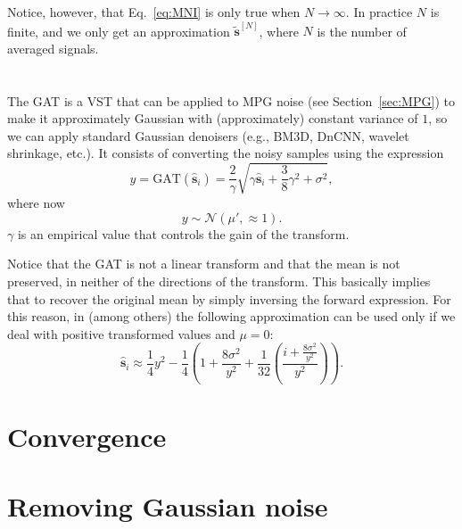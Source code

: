 Notice, however, that Eq.~\ref{eq:MNI} is only true when
$N\rightarrow\infty$. In practice $N$ is finite, and we only get an
approximation $\tilde{\bm{s}}^{[N]}$, where $N$ is the number of
averaged signals.


\section{}

The \acrshort{GAT} \cite{foi2008practical,makitalo2012optimal} is a
\gls{VST} that can be applied to \gls{MPG} noise (see
Section~\ref{sec:MPG}) to make it approximately Gaussian with
(approximately) constant variance of $1$, so we can apply standard
Gaussian denoisers (e.g., \gls{BM3D}, \gls{DnCNN}, wavelet shrinkage,
etc.). It consists of converting the noisy samples using the
expression
\begin{equation}
  y = \text{GAT}(\hat{\mathbf{s}}_i)=\frac{2}{\gamma}\sqrt{\gamma\hat{\mathbf{s}}_i+\frac{3}{8}\gamma^2+\sigma^2},
\end{equation}
where now
\begin{equation}
  y\sim\mathcal{N}(\mu',\approx 1).
\end{equation}
$\gamma$ is an empirical value that controls the gain of the transform.

Notice that the \gls{GAT} is not a linear transform and that the mean is
not preserved, in neither of the directions of the transform. This
basically implies that to recover the original mean by simply
inversing the forward expression. For this reason, in
\cite{makitalo2012optimal} (among others) the following approximation
can be used only if we deal with positive transformed values and $\mu=0$:
\begin{equation}
  \hat{\mathbf{s}}_i \approx \frac{1}{4}y^2-\frac{1}{4}\left(1+\frac{8\sigma^2}{y^2} + \frac{1}{32}\left(\frac{i+\frac{8\sigma^2}{y^2}}{y^2}\right)\right).
\end{equation}


\section{Convergence}

\section{Removing Gaussian noise}

